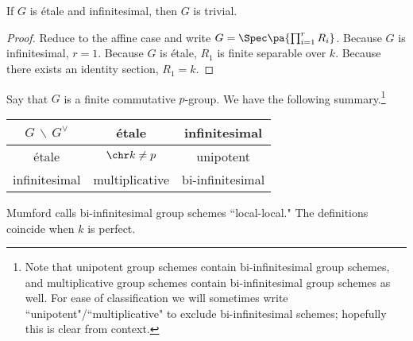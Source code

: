 \begin{lem}
If $G$ is \'etale and infinitesimal, then $G$ is trivial.
\end{lem}
\begin{proof}
Reduce to the affine case and write $G=\Spec\pa{\prod_{i=1}^r R_i}$. 
Because $G$ is infinitesimal, $r=1$. Because $G$ is \'etale, $R_1$ is finite separable over $k$. Because there exists an identity section, $R_1=k$.
\end{proof}
Say that $G$ is a finite commutative $p$-group. 
We have the following summary.\footnote{Note that unipotent group schemes contain bi-infinitesimal group schemes, and multiplicative group schemes contain bi-infinitesimal group schemes as well. For ease of classification we will sometimes write ``unipotent"/``multiplicative" to exclude bi-infinitesimal schemes; hopefully this is clear from context.}

\begin{center}
\begin{tabular}{|c|c|c|}
\hline 
$G\,\backslash\, G^{\vee}$  & \'etale & infinitesimal\tabularnewline
\hline 
\'etale & $\chr k\ne p$ & unipotent\tabularnewline
\hline 
infinitesimal & multiplicative & bi-infinitesimal\tabularnewline
\hline 
\end{tabular}
\end{center}

Mumford calls bi-infinitesimal group schemes ``local-local." The definitions coincide when $k$ is perfect.

